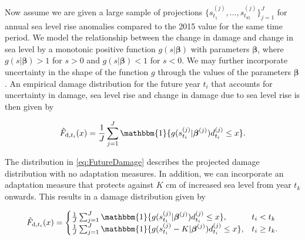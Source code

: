 \documentclass[draft,linenumbers]{agujournal}
\begin{document}
Now assume we are given a large sample of projections $\{s_{t_1}^{(j)}, \ldots, s_{t_{85}}^{(j)} \}_{j=1}^J$ for annual sea level rise anomalies compared to the 2015 value for the same time period. We model the relationship between the change in damage and change in sea level by a monotonic positive function $g(s| \boldsymbol \beta )$ with parameters $\boldsymbol \beta$, where $g(s|\boldsymbol \beta ) > 1$ for $s>0$ and $g(s|\boldsymbol \beta ) < 1$ for $s < 0$. We may further incorporate uncertainty in the shape of the function $g$ through the values of the parameters $\boldsymbol \beta$. An empirical damage distribution for the future year $t_i$ that accounts for uncertainty in damage, sea level rise and change in damage due to sea level rise is then given by
\begin{linenomath*}
  \begin{equation}\label{eq:FutureDamage}
    \hat{F}_{\textup{d}, t_i} (x) = \frac{1}{J} \sum_{j=1}^J \mathbbm{1}\{g(s_{t_i}^{(j)}| \boldsymbol \beta^{(j)}) d_{t_i}^{(j)} \leq x \}.
  \end{equation}
\end{linenomath*}

The distribution in \eqref{eq:FutureDamage} describes the projected damage distribution with no adaptation measures. In addition, we can incorporate an adaptation measure that protects against $K$ cm of increased sea level from year $t_k$ onwards. This results in a damage distribution given by
\begin{linenomath*}
  \[
  \hat{F}_{\textup{d}, t_i} (x) =
    \begin{cases}
      \frac{1}{J} \sum_{j=1}^J \mathbbm{1}\{g(s_{t_i}^{(j)}| \boldsymbol \beta^{(j)}) d_{t_i}^{(j)} \leq x \}, & t_i < t_k \\
      \frac{1}{J} \sum_{j=1}^J \mathbbm{1}\{g(s_{t_i}^{(j)} - K| \boldsymbol \beta^{(j)}) d_{t_i}^{(j)} \leq x \}, & t_i \geq t_k. \\
    \end{cases}
  \]
\end{linenomath*}
\end{document}
